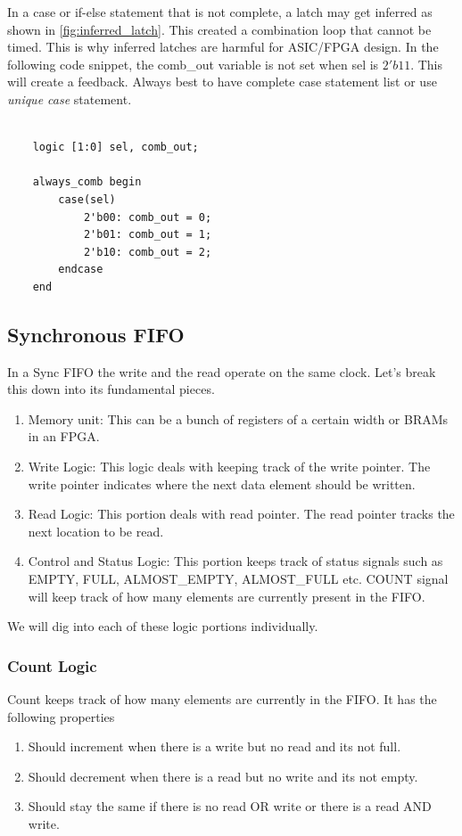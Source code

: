 \documentclass{article}
\begin{document}
In a case or if-else statement that is not complete, a latch may get inferred as shown in \ref{fig:inferred_latch}. This created a combination loop that cannot be timed. This is why inferred latches are harmful for ASIC/FPGA design. In the following code snippet, the comb\_out variable is not set when sel is $2'b11$. This will create a feedback. Always best to have complete case statement list or use \textit{unique case} statement.

\begin{Verbatim}
	
	logic [1:0] sel, comb_out;

	always_comb begin
		case(sel)
			2'b00: comb_out = 0;
			2'b01: comb_out = 1;
			2'b10: comb_out = 2; 
		endcase
	end
\end{Verbatim}


\subsection{Synchronous FIFO}


In a Sync FIFO the write and the read operate on the same clock. Let's break this down into its fundamental pieces. 
\begin{enumerate}
	\item Memory unit: This can be a bunch of registers of a certain width or BRAMs in an FPGA.
	\item Write Logic: This logic deals with keeping track of the write pointer. The write pointer indicates where the next data element should be written. 
	\item Read Logic: This portion deals with read pointer. The read pointer tracks the next location to be read.  
	\item Control and Status Logic: This portion keeps track of status signals such as EMPTY, FULL, ALMOST\_EMPTY, ALMOST\_FULL etc. COUNT signal will keep track of how many elements are currently present in the FIFO. 
\end{enumerate}

We will dig into each of these logic portions individually. 

\subsubsection{Count Logic}
Count keeps track of how many elements are currently in the FIFO. It has the following properties

\begin{enumerate}
	\item Should increment when there is a write but no read and its not full.
	\item Should decrement when there is a read but no write and its not empty.
	\item Should stay the same if there is no read OR write or there is a read AND write.
\end{enumerate}
\end{document}
